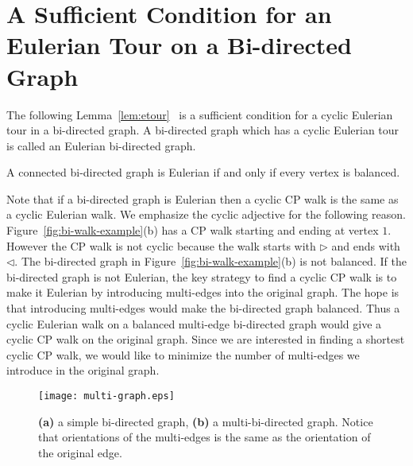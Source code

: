 \documentclass[runningheads]{llncs}
\begin{document}
\section{A Sufficient Condition for an Eulerian Tour on a Bi-directed Graph} 
The following Lemma~\ref{lem:etour}~\cite{bidirected_graph} is a sufficient condition for a cyclic 
Eulerian tour in a bi-directed graph. A bi-directed graph which has a cyclic Eulerian tour is called
an Eulerian bi-directed graph.
\begin{lemma}
\label{lem:etour}
A connected bi-directed graph is Eulerian if and only if every vertex is balanced.
\end{lemma}
Note that if a bi-directed graph is Eulerian then a cyclic CP walk is the same as a cyclic Eulerian
walk. We emphasize the cyclic adjective for the following reason. Figure~\ref{fig:bi-walk-example}(b) has a 
CP walk starting and ending at vertex $1$. However the CP walk is not cyclic because the walk starts
with $\rhd$ and ends with $\lhd$. The bi-directed graph in Figure~\ref{fig:bi-walk-example}(b)
is not balanced. If the bi-directed graph is not Eulerian, the key strategy to find
a cyclic CP walk is to make it Eulerian by introducing multi-edges into the original graph. The hope is that 
introducing multi-edges would make the bi-directed graph balanced. Thus a cyclic Eulerian walk on a balanced 
multi-edge bi-directed graph would give a cyclic CP walk on the original graph. Since we are interested
in finding a shortest cyclic CP walk, we would like to minimize the number of multi-edges we introduce
in the original graph.

\begin{figure*}
\label{fig:multi-example}
\begin{center}
\texttt{[image: multi-graph.eps]}
\end{center}
\caption{{\bf (a)} a simple bi-directed graph, {\bf (b)} a multi-bi-directed graph. Notice that orientations
of the multi-edges is the same as the orientation of the original edge.}
\end{figure*}
\end{document}
